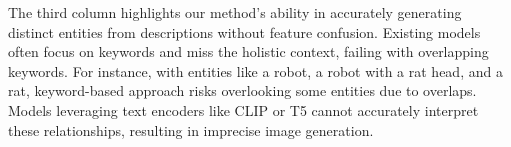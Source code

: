 The third column highlights our method's ability in accurately generating distinct entities from descriptions without feature confusion. Existing models often focus on keywords and miss the holistic context, failing with overlapping keywords. For instance, with entities like a robot, a robot with a rat head, and a rat, keyword-based approach risks overlooking some entities due to overlaps. Models leveraging text encoders like CLIP or T5 cannot accurately interpret these relationships, resulting in imprecise image generation.

